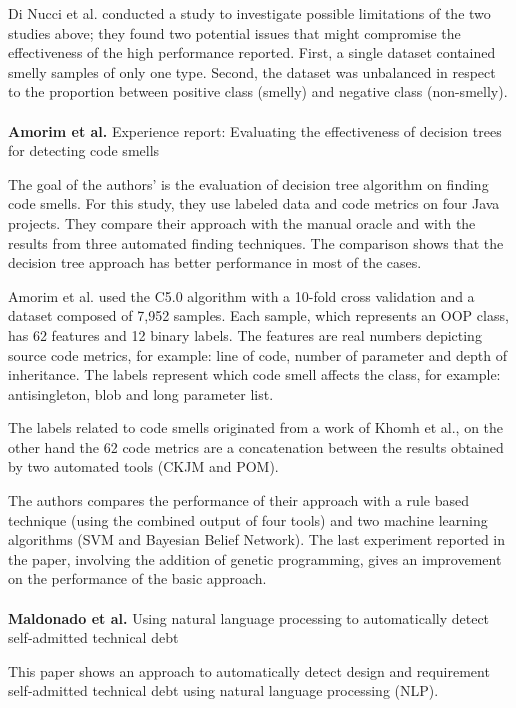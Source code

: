 Di Nucci et al. \cite{di2018detecting} conducted a study to investigate possible limitations of the two studies above; they found two potential issues that might compromise the effectiveness of the high performance reported. 
First, a single dataset contained smelly samples of only one type. Second, the dataset was unbalanced in respect to the proportion between positive class (smelly) and negative class (non-smelly). 
\\
\\
\textbf{Amorim et al.} \cite{amorim2015experience} Experience report: Evaluating the effectiveness of decision trees for detecting code smells

The goal of the authors' is the evaluation of decision tree algorithm on finding code smells. For this study, they use labeled data and code metrics on four Java projects.
They compare their approach with the manual oracle and with the results from three automated finding techniques. 
The comparison shows that the decision tree approach has better performance in most of the cases.

Amorim et al. used the C5.0 algorithm with a 10-fold cross validation and a dataset composed of 7,952 samples. Each sample, which represents an OOP class, has 62 features and 12 binary labels. The features are real numbers depicting source code metrics, for example: line of code, number of parameter and depth of inheritance. The labels represent which code smell affects the class, for example: antisingleton, blob and long parameter list.

The labels related to code smells originated from a work of Khomh et al., \cite{khomh2012exploratory} on the other hand the 62 code metrics are a concatenation between the results obtained by two automated tools (CKJM and POM).

The authors compares the performance of their approach with a rule based technique (using the combined output of four tools) and two machine learning algorithms (SVM and Bayesian Belief Network).
The last experiment reported in the paper, involving the addition of genetic programming, gives an improvement on the performance of the basic approach.
\\
\\
\textbf{Maldonado et al.} \cite{maldonado2017using} Using natural language processing to automatically detect self-admitted technical debt

This paper shows an approach to automatically detect design and requirement self-admitted technical debt using natural language processing (NLP). 

